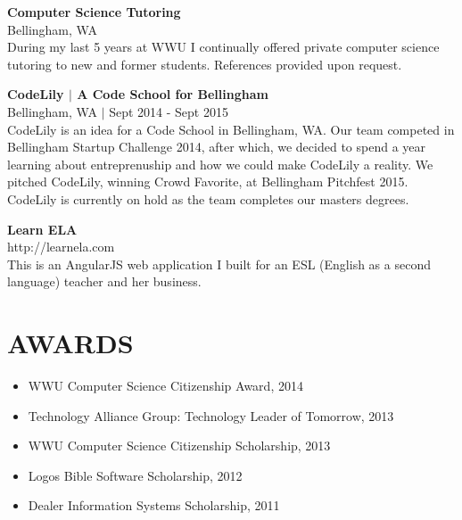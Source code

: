 \documentclass[line,margin]{res}
\begin{document}
\begin{resume}
    {\bf Computer Science Tutoring} \\
    {\footnotesize Bellingham, WA} \\
    During my last 5 years at WWU I continually offered private computer science tutoring to new and former students. References provided upon request.

    {\bf CodeLily $|$ A Code School for Bellingham} \\
    {\footnotesize Bellingham, WA $|$ Sept 2014 - Sept 2015} \\
    CodeLily is an idea for a Code School in Bellingham, WA.  Our team competed in Bellingham Startup Challenge 2014, after which, we decided to spend a year learning about entreprenuship and how we could make CodeLily a reality.  We pitched CodeLily, winning Crowd Favorite, at Bellingham Pitchfest 2015.  CodeLily is currently on hold as the team completes our masters degrees.

    {\bf Learn ELA} \\
    {\footnotesize http://learnela.com} \\
    This is an AngularJS web application I built for an ESL  (English as a second language) teacher and her business.

\section{AWARDS}
    \begin{itemize} \itemsep -3pt
        \item WWU Computer Science Citizenship Award, 2014
        \item Technology Alliance Group: Technology Leader of Tomorrow, 2013
        \item WWU Computer Science Citizenship Scholarship, 2013
        \item Logos Bible Software Scholarship, 2012
        \item Dealer Information Systems Scholarship, 2011
    \end{itemize}


\end{resume}
\end{document}
